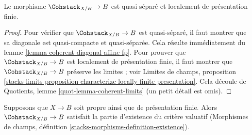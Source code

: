 \begin{lemma}
\label{lemma-coherent-qs-lfp}
Le morphisme $\Cohstack_{X/B} \to B$ est quasi-séparé et localement de
présentation finie.
\end{lemma}

\begin{proof}
Pour vérifier que $\Cohstack_{X/B} \to B$ est quasi-séparé, il faut
montrer que sa diagonale est quasi-compacte et quasi-séparée.
Cela résulte immédiatement du lemme
\ref{lemma-coherent-diagonal-affine-fp}.
Pour prouver que $\Cohstack_{X/B} \to B$ est localement de présentation
finie, il faut montrer que $\Cohstack_{X/B} \to B$ préserve les limites ;
voir Limites de champs, proposition
\ref{stacks-limits-proposition-characterize-locally-finite-presentation}.
Cela découle de Quotients, lemme \ref{quot-lemma-coherent-limits}
(un petit détail est omis).
\end{proof}

\begin{lemma}
\label{lemma-coherent-existence-part}
Supposons que $X \to B$ soit propre ainsi que de présentation finie.
Alors $\Cohstack_{X/B} \to B$ satisfait la partie d'existence du critère
valuatif (Morphismes de champs, définition
\ref{stacks-morphisms-definition-existence}).
\end{lemma}


